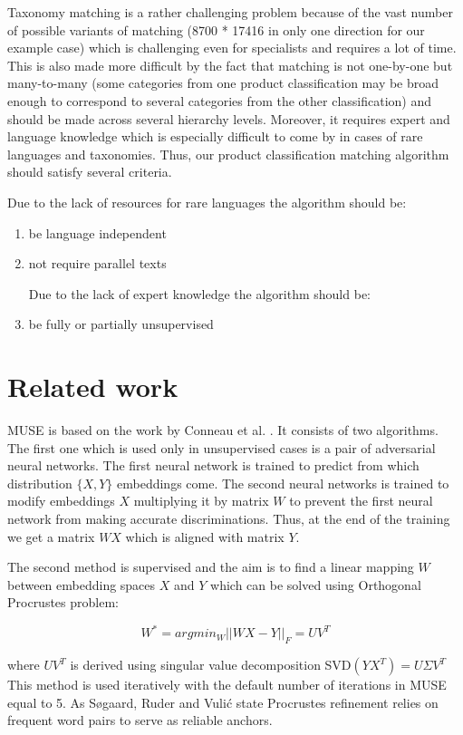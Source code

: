 \documentclass[conference]{IEEEtran}
\begin{document}
Taxonomy matching is a rather challenging problem because of the vast number of possible variants of matching (8700 * 17416 in only one direction for our example case) which is challenging even for specialists and requires a lot of time. This is also made more difficult by the fact that matching is not one-by-one but many-to-many (some categories from one product classification may be broad enough to correspond to several categories from the other classification) and should be made across several hierarchy levels. Moreover, it requires expert and language knowledge which is especially difficult to come by in cases of rare languages and taxonomies. Thus, our product classification matching algorithm should satisfy several criteria.

Due to the lack of resources for rare languages	the algorithm should be:
\begin{enumerate}

\item be language independent

\item not require parallel texts


Due to the lack of expert knowledge the algorithm should be:

\item be fully or partially unsupervised
\end{enumerate}
\section{Related work}

MUSE is based on the work by Conneau et al. \cite{muse}. It consists of two algorithms. The first one which is used only in unsupervised cases is a pair of adversarial neural networks. The first neural network is trained to predict from which distribution $\{X, Y\}$ embeddings come. The second neural networks is trained to modify embeddings $X$ multiplying it by matrix $W$ to prevent the first neural network from making accurate discriminations. Thus, at the end of the training we get a matrix $WX$ which is aligned with matrix $Y$.

The second method is supervised and the aim is to find a linear mapping $W$ between embedding spaces $X$ and $Y$ which can be solved using Orthogonal Procrustes problem:

$$ W^* = argmin_W ||WX - Y||_F = UV^T$$

where $UV^T$ is derived using singular value decomposition SVD$(YX^T) = U \Sigma V^T$
This method is used iteratively with the default number of iterations in MUSE equal to 5. As Søgaard, Ruder and Vulić state Procrustes refinement relies on frequent word pairs to serve as reliable anchors.
\end{document}
